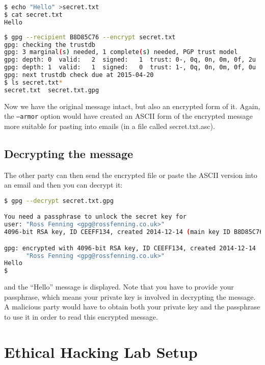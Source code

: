 \documentclass{report}
\begin{document}
\begin{lstlisting}[language=bash]
$ echo "Hello" >secret.txt
$ cat secret.txt 
Hello
\end{lstlisting}

\begin{lstlisting}[language=bash]
$ gpg --recipient B8D85C76 --encrypt secret.txt
gpg: checking the trustdb
gpg: 3 marginal(s) needed, 1 complete(s) needed, PGP trust model
gpg: depth: 0  valid:   2  signed:   1  trust: 0-, 0q, 0n, 0m, 0f, 2u
gpg: depth: 1  valid:   1  signed:   0  trust: 1-, 0q, 0n, 0m, 0f, 0u
gpg: next trustdb check due at 2015-04-20
$ ls secret.txt*
secret.txt  secret.txt.gpg
\end{lstlisting}

Now we have the original message intact, but also an encrypted form of it.
Again, the \texttt{--armor} option would have created an ASCII form of
the encrypted message more suitable for pasting into emails (in a file
called secret.txt.asc).

\section{Decrypting the message}

The other party can then send the encrypted file or paste the ASCII version into
an email and then you can decrypt it:

\begin{lstlisting}[language=bash]
$ gpg --decrypt secret.txt.gpg

You need a passphrase to unlock the secret key for
user: "Ross Fenning <gpg@rossfenning.co.uk>"
4096-bit RSA key, ID CEEFF134, created 2014-12-14 (main key ID B8D85C76)

gpg: encrypted with 4096-bit RSA key, ID CEEFF134, created 2014-12-14
      "Ross Fenning <gpg@rossfenning.co.uk>"
Hello
$
\end{lstlisting}

\noident and the ``Hello'' message is displayed. Note that you have to
provide your passphrase, which means your private key is involved in
decrypting the message. A malicious party would have to obtain both
your private key and the passphrase to use it in order to read this
encrypted message.

\chapter{Ethical Hacking Lab Setup}
\end{document}
